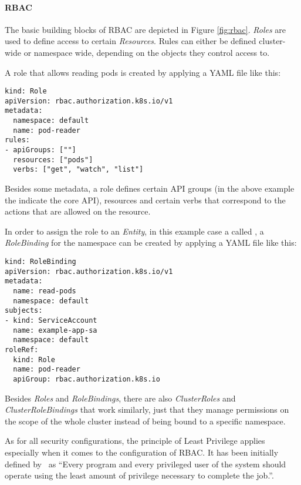 \paragraph{\ac{RBAC}}


The basic building blocks of \ac{RBAC} are depicted in Figure \ref{fig:rbac}. \textit{Roles} are used to define access to certain \textit{Resources}. Rules can either be defined cluster-wide or namespace wide, depending on the objects they control access to.

A role that allows reading pods is created by applying a YAML file like this: 

\begin{verbatim}
kind: Role
apiVersion: rbac.authorization.k8s.io/v1
metadata:
  namespace: default
  name: pod-reader
rules:
- apiGroups: [""]
  resources: ["pods"]
  verbs: ["get", "watch", "list"]
\end{verbatim}

Besides some metadata, a role defines certain API groups (in the above example the  indicate the core API), resources and certain verbs that correspond to the actions that are allowed on the resource. 

In order to assign the role to an \textit{Entity}, in this example case a  called , a \textit{RoleBinding} for the namespace  can be created by applying a YAML file like this:

\begin{verbatim}
kind: RoleBinding
apiVersion: rbac.authorization.k8s.io/v1
metadata:
  name: read-pods
  namespace: default
subjects:
- kind: ServiceAccount
  name: example-app-sa 
  namespace: default
roleRef:
  kind: Role
  name: pod-reader
  apiGroup: rbac.authorization.k8s.io
\end{verbatim}

Besides \textit{Roles} and \textit{RoleBindings}, there are also \textit{ClusterRoles} and \textit{ClusterRoleBindings} that work similarly, just that they manage permissions on the scope of the whole cluster instead of being bound to a specific namespace.

As for all security configurations, the principle of Least Privilege applies especially when it comes to the configuration of \ac{RBAC}. It has been initially defined by~\textcite{leastPrivilege} as \enquote{Every program and every privileged user of the system should operate using the least amount of privilege necessary to complete the job.}. 

